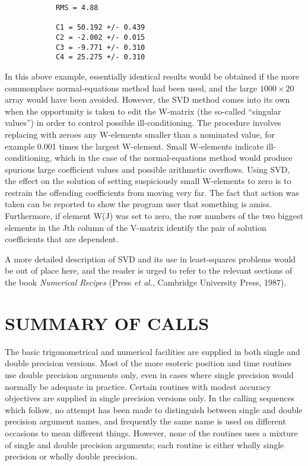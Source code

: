 \documentclass[11pt,twoside]{article}
\begin{document}
\goodbreak
\begin{verbatim}
            RMS = 4.88

            C1 = 50.192 +/- 0.439
            C2 = -2.002 +/- 0.015
            C3 = -9.771 +/- 0.310
            C4 = 25.275 +/- 0.310
\end{verbatim}
\goodbreak
In this above example, essentially
identical results would be obtained if the more
commonplace normal-equations method had been used, and the large
$1000\times20$ array would have been avoided.  However, the SVD method
comes into its own when the opportunity is taken to edit the W-matrix
(the so-called ``singular values'') in order to control
possible ill-conditioning.  The procedure involves replacing with
zeroes any W-elements smaller than a nominated value, for example
0.001 times the largest W-element.  Small W-elements indicate
ill-conditioning, which in the case of the normal-equations
method would produce spurious large coefficient values and
possible arithmetic overflows.  Using SVD, the effect on the solution
of setting suspiciously small W-elements to zero is to restrain
the offending coefficients from moving very far.  The
fact that action was taken can be reported to show the program user that
something is amiss.  Furthermore, if element W(J) was set to zero,
the row numbers of the two biggest elements in the Jth column of the
V-matrix identify the pair of solution coefficients that are
dependent.

A more detailed description of SVD and its use in least-squares
problems would be out of place here, and the reader is urged
to refer to the relevant sections of the book {\it Numerical Recipes}
(Press {\it et al.}, Cambridge University Press, 1987).

\pagebreak

\section{SUMMARY OF CALLS}
The basic trigonometrical and numerical facilities are supplied in both single
and double precision versions.
Most of the more esoteric position and time routines use double precision
arguments only, even in cases where single precision would normally be adequate
in practice.
Certain routines with modest accuracy objectives are supplied in
single precision versions only.
In the calling sequences which follow, no attempt has been made
to distinguish between single and double precision argument names,
and frequently the same name is used on different occasions to
mean different things.
However, none of the routines uses a mixture of single and
double precision arguments;  each routine is either wholly
single precision or wholly double precision.
\end{document}
